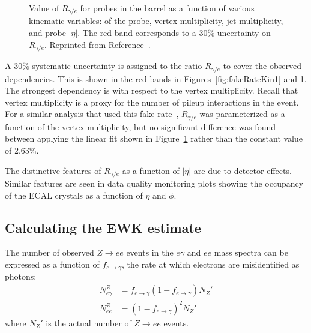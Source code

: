 \begin{figure}[h]
\begin{center}
\end{center}
\caption[Value of $R_{\gamma/e}$ for probes in the barrel as a function of various kinematic variables: \sigmaietaieta of the probe, 
vertex multiplicity, jet multiplicity, and probe $|\eta|$.]
{Value of $R_{\gamma/e}$ for probes in the barrel as a function of various kinematic variables: \sigmaietaieta of the probe, 
vertex multiplicity, jet multiplicity, and probe $|\eta|$. The red band corresponds to a 30\% uncertainty 
on $R_{\gamma/e}$. Reprinted from Reference~\cite{KnutAN}.
}
\label{fig:fakeRateKin2}
\end{figure}

A 30\% systematic uncertainty is assigned to the ratio $R_{\gamma/e}$ to cover the observed dependencies. 
This is shown in the red bands in Figures~\ref{fig:fakeRateKin1} and \ref{fig:fakeRateKin2}. The strongest dependency is with respect
to the vertex multiplicity. Recall that vertex multiplicity is a proxy for the number of pileup interactions in the event. For a similar analysis that 
used this fake rate~\cite{PhotonHT}, $R_{\gamma/e}$ was parameterized as a function of the vertex multiplicity, but no significant difference was found between 
applying the linear fit shown in Figure~\ref{fig:fakeRateKin2} rather than the constant value of 2.63\%.

The distinctive features of $R_{\gamma/e}$ as a function of $|\eta|$ are due to detector effects. Similar features are seen in data quality monitoring plots showing the occupancy of the ECAL crystals as a function of $\eta$ and $\phi$. 


\subsection{Calculating the EWK estimate}
\label{sec:transfer}
The number of observed $Z\rightarrow ee$ events in the $e\gamma$ and $ee$ mass spectra can be expressed as a function of $f_{e\rightarrow\gamma}$, the rate at which electrons are misidentified as photons:
\begin{equation}
\begin{aligned}
\label{equ:fake}
N_{e\gamma}^Z &= f_{e\rightarrow\gamma}(1- f_{e\rightarrow\gamma})N_{Z}'\\
N_{ee}^Z &= (1-f_{e\rightarrow\gamma})^2N_{Z}'
\end{aligned}
\end{equation}
where $N_{Z}'$ is the actual number of $Z\rightarrow ee$ events. 

